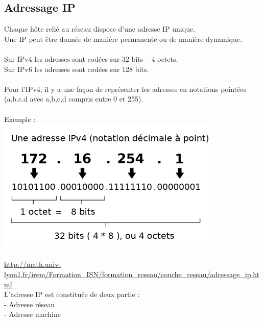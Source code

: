 \documentclass{article}
\begin{document}
\subsection{Adressage IP}
Chaque hôte relié au réseau dispose d’une adresse IP unique. \\
Une IP peut être donnée de manière permanente ou de manière dynamique. \\ 
\\
Sur IPv4 les adresses sont codées sur 32 bits – 4 octets. \\
Sur IPv6 les adresses sont codées sur 128 bits. \\
\\
Pour l'IPv4, il y a une façon de représenter les adresses en notations pointées (a.b.c.d avec a,b,c,d compris entre 0 et 255). \\
\\
\newpage
Exemple : \\
\includegraphics{image/IPv4.png} \\
\\
\url{http://math.univ-lyon1.fr/irem/Formation_ISN/formation_reseau/couche_reseau/adressage_ip.html}
\\
\newpage
L’adresse IP est constituée de deux partie : \\
- Adresse réseau \\
- Adresse machine \\
\\
\end{document}

